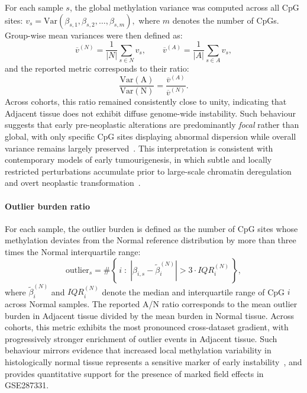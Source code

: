 For each sample $s$, the global methylation variance was computed across all CpG sites:
$
v_s = \mathrm{Var}\!\left(\beta_{s,1}, \beta_{s,2}, \ldots, \beta_{s,m}\right),
$
where $m$ denotes the number of CpGs. Group-wise mean variances were then defined as:
\begin{equation}
\overline{v}^{(N)} = \frac{1}{|N|} \sum_{s \in N} v_s,
\qquad
\overline{v}^{(A)} = \frac{1}{|A|} \sum_{s \in A} v_s,
\label{eq:group_mean_variance}
\end{equation}
and the reported metric corresponds to their ratio:
\begin{equation}
\mathrm{\frac{Var(A)}{Var(N)}} = 
\frac{\overline{v}^{(A)}}{\overline{v}^{(N)}}.
\label{eq:variance_ratio}
\end{equation}
Across cohorts, this ratio remained consistently close to unity, indicating that Adjacent tissue does not exhibit diffuse genome-wide instability.  
Such behaviour suggests that early pre-neoplastic alterations are predominantly \emph{focal} rather than global, with only specific CpG sites displaying abnormal dispersion while overall variance remains largely preserved~\cite{Yates2024_NormalMucosaField}.  
This interpretation is consistent with contemporary models of early tumourigenesis, in which subtle and locally restricted perturbations accumulate prior to large-scale chromatin deregulation and overt neoplastic transformation~\cite{Zhang2024_TumorInitiationEpigenetic}.


\paragraph{Outlier burden ratio}  
For each sample, the outlier burden is defined as the number of CpG sites whose methylation 
deviates from the Normal reference distribution by more than three times the Normal 
interquartile range:
\begin{equation}
\text{outlier}_s = 
\#\left\{\, i \;:\; 
\left| \beta_{i,s} - \tilde{\beta}^{(N)}_i \right| 
> 3 \cdot IQR^{(N)}_i \,\right\},
\label{eq:outlier_burden}
\end{equation}
where $\tilde{\beta}^{(N)}_i$ and $IQR^{(N)}_i$ denote the median and interquartile range of CpG $i$ 
across Normal samples.  
The reported A/N ratio corresponds to the mean outlier burden in Adjacent tissue divided by the 
mean burden in Normal tissue. Across cohorts, this metric exhibits the most pronounced cross-dataset gradient, with progressively stronger enrichment of outlier events in Adjacent tissue.  
Such behaviour mirrors evidence that increased local methylation variability in histologically normal tissue represents a sensitive marker of early instability~\cite{Yates2024_NormalMucosaField}, and provides quantitative support for the presence of marked field effects in GSE287331.

